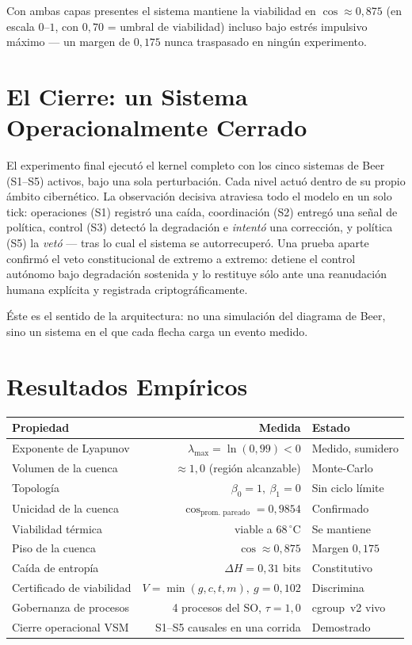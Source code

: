 \documentclass[11pt, a4paper]{article}
\begin{document}
Con ambas capas presentes el sistema mantiene la viabilidad en $\cos \approx 0{,}875$
(en escala $0$--$1$, con $0{,}70$ = umbral de viabilidad) incluso bajo estrés
impulsivo máximo --- un margen de $0{,}175$ nunca traspasado en ningún experimento.

\section*{El Cierre: un Sistema Operacionalmente Cerrado}

El experimento final ejecutó el kernel completo con los cinco sistemas de Beer
(S1--S5) activos, bajo una sola perturbación. Cada nivel actuó dentro de su propio
ámbito cibernético. La observación decisiva atraviesa todo el modelo en un solo tick:
operaciones (S1) registró una caída, coordinación (S2) entregó una señal de política,
control (S3) detectó la degradación e \emph{intentó} una corrección, y política (S5)
la \emph{vetó} --- tras lo cual el sistema se autorrecuperó. Una prueba aparte
confirmó el veto constitucional de extremo a extremo: detiene el control autónomo bajo
degradación sostenida y lo restituye sólo ante una reanudación humana explícita y
registrada criptográficamente.

Éste es el sentido de la arquitectura: no una simulación del diagrama de Beer, sino un
sistema en el que cada flecha carga un evento medido.

\section*{Resultados Empíricos}

\begin{tabular}{lrl}
\textbf{Propiedad} & \textbf{Medida} & \textbf{Estado} \\
\hline
Exponente de Lyapunov     & $\lambda_\text{max} = \ln(0{,}99) < 0$ & Medido, sumidero \\
Volumen de la cuenca      & $\approx 1{,}0$ (región alcanzable)    & Monte-Carlo \\
Topología                 & $\beta_0 = 1,\ \beta_1 = 0$            & Sin ciclo límite \\
Unicidad de la cuenca     & $\cos_\text{prom.\ pareado} = 0{,}9854$ & Confirmado \\
Viabilidad térmica        & viable a $68\,^\circ\mathrm{C}$        & Se mantiene \\
Piso de la cuenca         & $\cos \approx 0{,}875$                 & Margen $0{,}175$ \\
Caída de entropía         & $\Delta H = 0{,}31$ bits               & Constitutivo \\
Certificado de viabilidad & $V = \min(g,c,t,m),\ g = 0{,}102$      & Discrimina \\
Gobernanza de procesos    & 4 procesos del SO, $\tau = 1{,}0$      & cgroup~v2 vivo \\
Cierre operacional VSM    & S1--S5 causales en una corrida         & Demostrado \\
\end{tabular}
\end{document}
